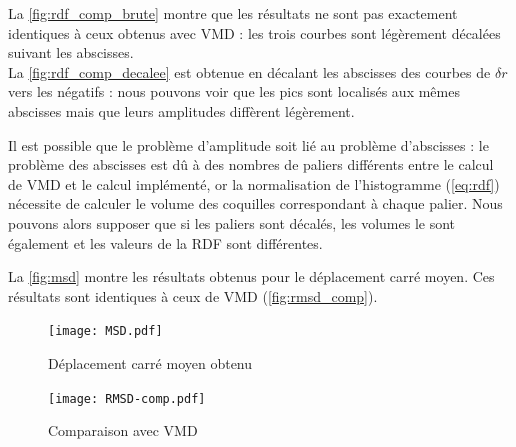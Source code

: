 \documentclass[11pt, a4paper]{article}
\begin{document}
La \autoref{fig:rdf_comp_brute} montre que les résultats ne sont pas exactement identiques à ceux obtenus avec VMD : les trois courbes sont légèrement décalées suivant les abscisses.\\
La \autoref{fig:rdf_comp_decalee} est obtenue en décalant les abscisses des courbes de $\delta r$ vers les négatifs : nous pouvons voir que les pics sont localisés aux mêmes abscisses mais que leurs amplitudes diffèrent légèrement.

Il est possible que le problème d'amplitude soit lié au problème d'abscisses : le problème des abscisses est dû à des nombres de paliers différents entre le calcul de VMD et le calcul implémenté, or la normalisation de l'histogramme (\autoref{eq:rdf}) nécessite de calculer le volume des coquilles correspondant à chaque palier. Nous pouvons alors supposer que si les paliers sont décalés, les volumes le sont également et les valeurs de la RDF sont différentes.

La \autoref{fig:msd} montre les résultats obtenus pour le déplacement carré moyen. Ces résultats sont identiques à ceux de VMD (\autoref{fig:rmsd_comp}).

\begin{figure}[hpbt]
	\centering
	\texttt{[image: MSD.pdf]}
	\caption{Déplacement carré moyen obtenu}
	\label{fig:msd}
\end{figure}

\begin{figure}[hptb]
	\centering
	\texttt{[image: RMSD-comp.pdf]}
	\caption{Comparaison avec VMD}
	\label{fig:rmsd_comp}
\end{figure}
\end{document}
